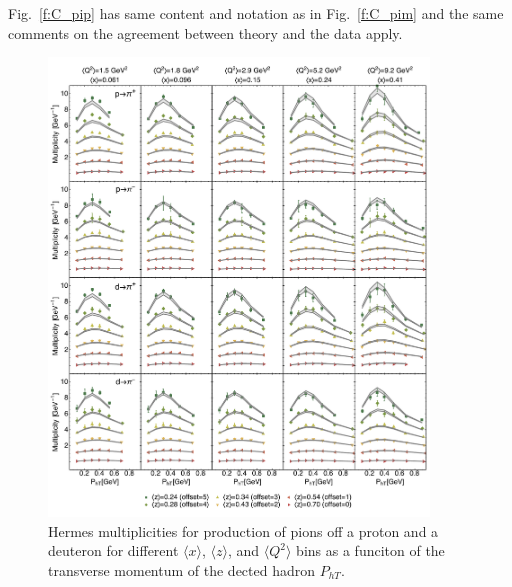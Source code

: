 \documentclass[aps,preprintnumbers,showpacs,nofootinbib,superscriptaddress,floatfix]{revtex4}
\begin{document}
Fig.~\ref{f:C_pip} has same content and notation as in Fig.~\ref{f:C_pim} and the same comments on the agreement between theory and the data apply.
\begin{figure}[h!]
\begin{center}
\includegraphics[width=0.90\textwidth]{plots/Hermes_Pions_SCIplot_flINDEP.pdf}
\end{center}
\caption{Hermes multiplicities for production of pions off a proton and a deuteron for different $\langle x \rangle$, $\langle z \rangle$, and $\langle Q^2 \rangle$ bins as a funciton of the transverse momentum of the dected hadron  $P_{hT}$.} 
\label{f:H_pions}
\end{figure}
\end{document}
